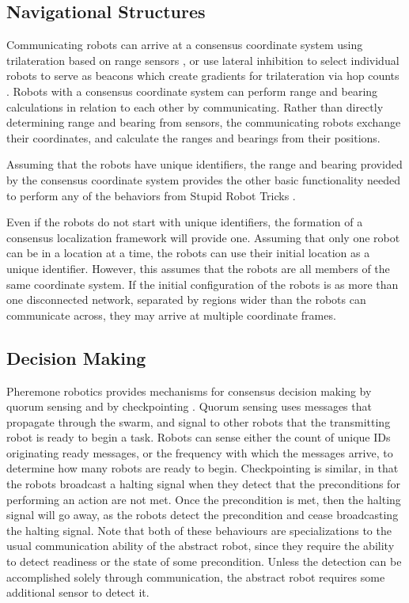 \documentclass[]{article}
\begin{document}
\subsection{Navigational Structures} \label{pheremone_nav_struct}

Communicating robots can arrive at a consensus coordinate system using trilateration based on range sensors \cite{cheng2005robust}, or use lateral inhibition to select individual robots to serve as beacons which create gradients for trilateration via hop counts \cite{nagpal1999organizing}.
Robots with a consensus coordinate system can perform range and bearing calculations in relation to each other by communicating.
Rather than directly determining range and bearing from sensors, the communicating robots exchange their coordinates, and calculate the ranges and bearings from their positions. 

Assuming that the robots have unique identifiers, the range and bearing provided by the consensus coordinate system provides the other basic functionality needed to perform any of the behaviors from Stupid Robot Tricks \cite{mclurkin2004stupid}.

Even if the robots do not start with unique identifiers, the formation of a consensus localization framework will provide one.
Assuming that only one robot can be in a location at a time, the robots can use their initial location as a unique identifier. 
However, this assumes that the robots are all members of the same coordinate system.
If the initial configuration of the robots is as more than one disconnected network, separated by regions wider than the robots can communicate across, they may arrive at multiple coordinate frames.

\subsection{Decision Making}

Pheremone robotics provides mechanisms for consensus decision making by quorum sensing and by checkpointing \cite{nagpal2004catalog}. 
Quorum sensing uses messages that propagate through the swarm, and signal to other robots that the transmitting robot is ready to begin a task. 
Robots can sense either the count of unique IDs originating ready messages, or the frequency with which the messages arrive, to determine how many robots are ready to begin. 
Checkpointing is similar, in that the robots broadcast a halting signal when they detect that the preconditions for performing an action are not met.
Once the precondition is met, then the halting signal will go away, as the robots detect the precondition and cease broadcasting the halting signal. 
Note that both of these behaviours are specializations to the usual communication ability of the abstract robot, since they require the ability to detect readiness or the state of some precondition. 
Unless the detection can be accomplished solely through communication, the abstract robot requires some additional sensor to detect it. 
\end{document}
